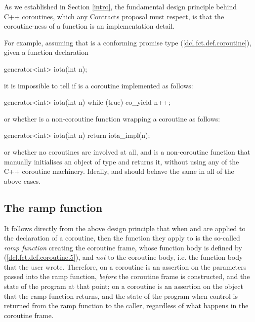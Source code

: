 As we established in Section \ref{intro}, the fundamental design principle behind C++ coroutines, which any Contracts proposal must respect, is that the coroutine-ness of a function  is an implementation detail.

For example, assuming that  is a conforming promise type (\href{https://eel.is/c++draft/dcl.fct.def.coroutine}{[dcl.fct.def.coroutine]}), given a function declaration 
\begin{codeblock}
generator<int> iota(int n); 
\end{codeblock}
it is impossible to tell if  is a coroutine implemented as follows:
\begin{codeblock}
generator<int> iota(int n) {
  while (true)
    co_yield n++;
}
\end{codeblock}
or whether  is a non-coroutine function wrapping a coroutine as follows:
\begin{codeblock}
generator<int> iota(int n) {
  return iota_impl(n);
}
\end{codeblock}
or whether no coroutines are involved at all, and  is a non-coroutine function that manually initialises an object of type  and returns it, without using any of the C++ coroutine machinery. Ideally,  and  should behave the same in all of the above cases.

\subsection{The ramp function}

It follows directly from the above design principle that when  and  are applied to the declaration of a coroutine, then the function they apply to is the so-called \emph{ramp function} creating the coroutine frame, whose function body is defined by ([\href{https://eel.is/c++draft/dcl.fct.def.coroutine#5}{dcl.fct.def.coroutine.5}]), and \emph{not} to the coroutine body, i.e. the function body that the user wrote. Therefore,  on a coroutine is an assertion on the parameters passed into the ramp function, \emph{before} the coroutine frame is constructed, and the state of the program at that point;  on a coroutine is an assertion on the object that the ramp function returns, and the state of the program when control is returned from the ramp function to the caller, regardless of what happens in the coroutine frame.

